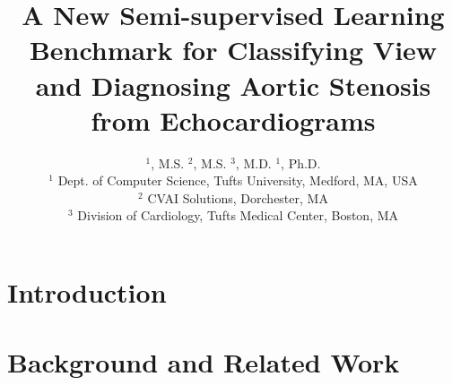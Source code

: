 \documentclass[pmlr]{jmlr_arxiv}%
\begin{document}
\setlength{\abovedisplayskip}{2pt plus 3pt}
\setlength{\belowdisplayskip}{2pt plus 3pt}

\title[SSL for Classifying View and Diagnosis Aortic Stenosis from Echocardiograms]{A New Semi-supervised Learning Benchmark for Classifying View and Diagnosing Aortic Stenosis from Echocardiograms}

\author{$^{1}$, M.S.
\AND
        $^{2}$, M.S.
\AND
        $^{3}$, M.D.
\AND       
        $^1$, Ph.D.
        \\
        \addr $^1$ Dept. of Computer Science, Tufts University, Medford, MA, USA
        \\
        \addr $^2$ CVAI Solutions, Dorchester, MA        \\
        \addr $^3$ Division of Cardiology, Tufts Medical Center, Boston, MA
}%


\maketitle

\begin{abstract}
  
\end{abstract}

\section{Introduction}
\label{sec:Introduction}


\section{Background and Related Work}
\label{sec:RelatedWork}



\end{document}

